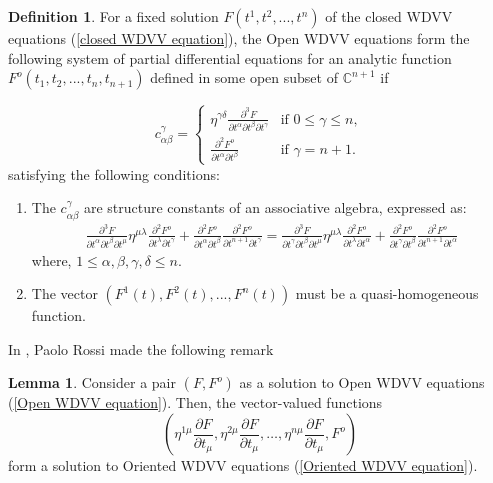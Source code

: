 \documentclass{article}
\theoremstyle{definition}
\newtheorem{definition}{Definition}[section]
\newtheorem{lemma}[theorem]{Lemma}
\begin{document}
\begin{definition}\cite{Alexander}
For a fixed solution $F(t^1, t^2, ..., t^n)$ of the closed WDVV equations (\ref{closed WDVV equation}), the Open WDVV equations form the following system of partial differential equations for an analytic function $F^o(t_1, t_2, ..., t_n, t_{n+1})$ defined in some open subset of $\mathbb{C}^{n+1}$ if 

\[
c_{\alpha \beta}^{\gamma}=
\begin{cases}
    \eta^{\gamma\delta}\frac{\partial^3 F}{\partial t^{\alpha}\partial t^{\beta}\partial t^{\gamma}} & \text{if } 0 \leq\gamma\leq n, \\
   \frac{\partial^2 F^o}{\partial t^{\alpha}\partial t^{\beta}}  & \text{if } \gamma=n+1.
\end{cases}
\] satisfying the following conditions:

\begin{enumerate}
    \item The $c_{\alpha \beta}^{\gamma}$ are structure constants of an associative algebra, expressed as:
\begin{equation}\label{Open WDVV equation 0}
\begin{split}
\frac{\partial^3 F}{\partial t^{\alpha}\partial t^{\beta}\partial t^{\mu}}\eta^{\mu\lambda}\frac{\partial^2 F^o}{\partial t^{\lambda}\partial t^{\gamma}}+\frac{\partial^2 F^o}{\partial t^{\alpha}\partial t^{\beta}}\frac{\partial^2 F^o}{\partial t^{n+1}\partial t^{\gamma}}=\frac{\partial^3 F}{\partial t^{\gamma}\partial t^{\beta}\partial t^{\mu}}\eta^{\mu\lambda}\frac{\partial^2 F^o}{\partial t^{\lambda}\partial t^{\alpha}}+\frac{\partial^2 F^o}{\partial t^{\gamma}\partial t^{\beta}}\frac{\partial^2 F^o}{\partial t^{n+1}\partial t^{\alpha}}
\end{split}
\end{equation}
where, $1 \leq \alpha, \beta, \gamma, \delta \leq n$.
    
    \item The vector $(F^1(t), F^2(t), ..., F^n(t))$ must be a quasi-homogeneous function.
\end{enumerate}
\end{definition}

In \cite{Alexander}, Paolo Rossi made the following remark

\begin{lemma} \cite{Alexander}
Consider a pair $(F, F^o)$ as a solution to  Open WDVV equations (\ref{Open WDVV equation}). Then, the vector-valued functions 
\begin{equation*}
\left(\eta^{1\mu} \frac{\partial F}{\partial t_\mu}, \eta^{2\mu} \frac{\partial F}{\partial t_\mu}, \ldots,\eta^{n\mu} \frac{\partial F}{\partial t_\mu}, F^o\right)
\end{equation*}
form a solution to  Oriented WDVV equations (\ref{Oriented WDVV equation}).

\end{lemma}
\end{document}
